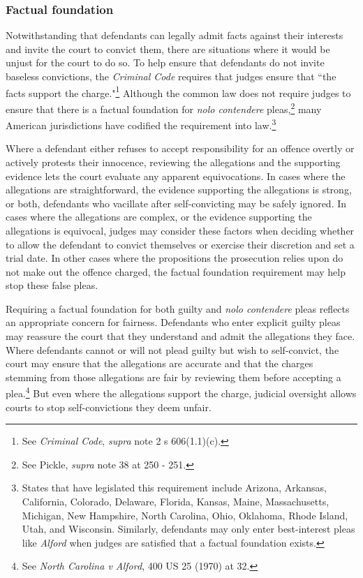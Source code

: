 \subsubsection{Factual foundation}

Notwithstanding that defendants can legally admit facts against their interests and invite the court to convict them, there are situations where it would be unjust for the court to do so. To help ensure that defendants do not invite baseless convictions, the \textit{Criminal Code} requires that judges ensure that ``the facts support the charge."\footnote{See \textit{Criminal Code}, \textit{supra} note 2 s 606(1.1)(c).} Although the common law does not require judges to ensure that there is a factual foundation for \textit{nolo contendere} pleas,\footnote{See Pickle, \textit{supra} note 38 at 250 - 251.} many American jurisdictions have codified the requirement into law.\footnote{States that have legislated this requirement include Arizona, Arkansas, California, Colorado, Delaware, Florida, Kansas, Maine, Massachusetts, Michigan, New Hampshire, North Carolina, Ohio, Oklahoma, Rhode Island, Utah, and Wisconsin. Similarly, defendants may only enter best-interest pleas like \textit{Alford} when judges are satisfied that a factual foundation exists.}

Where a defendant either refuses to accept responsibility for an offence overtly or actively protests their innocence, reviewing the allegations and the supporting evidence lets the court evaluate any apparent equivocations. In cases where the allegations are straightforward, the evidence supporting the allegations is strong, or both, defendants who vacillate after self-convicting may be safely ignored. In cases where the allegations are complex, or the evidence supporting the allegations is equivocal, judges may consider these factors when deciding whether to allow the defendant to convict themselves or exercise their discretion and set a trial date. In other cases where the propositions the prosecution relies upon do not make out the offence charged, the factual foundation requirement may help stop these false pleas.

Requiring a factual foundation for both guilty and \textit{nolo contendere} pleas reflects an appropriate concern for fairness. Defendants who enter explicit guilty pleas may reassure the court that they understand and admit the allegations they face. Where defendants cannot or will not plead guilty but wish to self-convict, the court may ensure that the allegations are accurate and that the charges stemming from those allegations are fair by reviewing them before accepting a plea.\footnote{See \textit{North Carolina v Alford}, 400 US 25 (1970) at 32.} But even where the allegations support the charge, judicial oversight allows courts to stop self-convictions they deem unfair.

